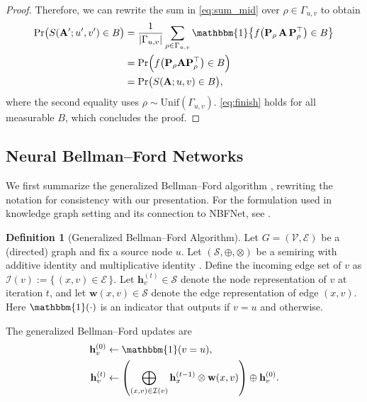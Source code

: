 \documentclass{article}
\newcommand*\circled[1]{\tikz[baseline=(char.base)]{
            \node[shape=circle,draw,inner sep=1pt] (char) {#1};}}
\theoremstyle{plain}
\theoremstyle{definition}
\newtheorem{definition}[theorem]{Definition}
\theoremstyle{remark}
\begin{document}
\begin{proof}
    Therefore, we can rewrite the sum in \eqref{eq:sum_mid} over $\rho\in\Gamma_{u,v}$ to obtain
    \begin{align}
    \Pr\!\big(S(\mathbf{A}';u',v')\in B\big)
    &= \frac{1}{|\Gamma_{u,v}|}\sum_{\rho\in\Gamma_{u,v}}
    \mathbbm{1}\!\left\{ f\!\left(\mathbf{P}_{\rho}\, \mathbf{A}\, \mathbf{P}_{\rho}^\top\right)\in B \right\} \nonumber\\
    &= \Pr\!\Big(f\!\left(\mathbf{P}_{\rho} \mathbf{A} \mathbf{P}_{\rho}^\top\right)\in B\Big) \nonumber\\
    &= \Pr\!\big(S(\mathbf{A};u,v)\in B\big), \label{eq:finish}
    \end{align}
    where the second equality uses $\rho\sim \mathrm{Unif}(\Gamma_{u,v})$.
    \eqref{eq:finish} holds for all measurable $B$, which concludes the proof.
\end{proof}

\subsection{Neural Bellman--Ford Networks} \label{app:nbfnet}

We first summarize the generalized Bellman--Ford algorithm \cite{baras_path_2010}, rewriting the notation for consistency with our presentation. For the formulation used in knowledge graph setting and its connection to NBFNet, see \cite{zhu_neural_bellman-ford_2021}.

\begin{definition}[Generalized Bellman--Ford Algorithm]
    \label{def:generalized-bellman-ford}
    Let $G=(\mathcal{V},\mathcal{E})$ be a (directed) graph and fix a source node $u$.  
    Let $(\mathcal{S},\oplus,\otimes)$ be a semiring with additive identity \circled{0} and multiplicative identity \circled{1}. Define the incoming edge set of $v$ as \(
    \mathcal{I}(v) := \{\, (x,v)\in\mathcal{E}\,\}.
    \)
    Let $\mathbf{h}_v^{(t)} \in \mathcal{S}$ denote the node representation of $v$ at iteration $t$, and let
    $\mathbf{w}(x,v)\in\mathcal{S}$ denote the edge representation of edge $(x,v)$.
    Here $\mathbbm{1}(\cdot)$ is an indicator that outputs \circled{1} if $v = u$ and \circled{0} otherwise.
    
    The generalized Bellman--Ford updates are
    \begin{align}
        \mathbf{h}_v^{(0)} &\leftarrow \mathbbm{1}(v = u), \label{eq:bellman-ford-init} \\
        \mathbf{h}_v^{(t)} &\leftarrow \left( \bigoplus_{(x,v) \in \mathcal{I}(v)} \mathbf{h}_x^{(t-1)} \otimes \mathbf{w}(x, v) \right) \oplus \mathbf{h}_v^{(0)}. \label{eq:bellman-ford-iter}
    \end{align}
\end{definition}
\end{document}
